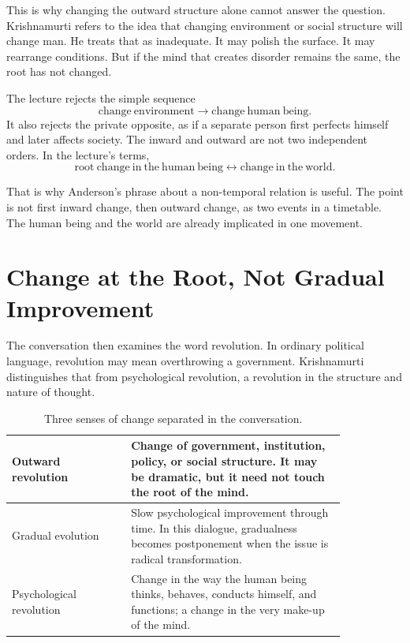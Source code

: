 This is why changing the outward structure alone cannot answer the question. Krishnamurti refers to the idea that changing environment or social structure will change man. He treats that as inadequate. It may polish the surface. It may rearrange conditions. But if the mind that creates disorder remains the same, the root has not changed.

The lecture rejects the simple sequence
\begin{equation}
\mathrm{change\ environment}
\longrightarrow
\mathrm{change\ human\ being}.
\end{equation}
It also rejects the private opposite, as if a separate person first perfects himself and later affects society. The inward and outward are not two independent orders. In the lecture's terms,
\begin{equation}
\mathrm{root\ change\ in\ the\ human\ being}
\longleftrightarrow
\mathrm{change\ in\ the\ world}.
\end{equation}

That is why Anderson's phrase about a non-temporal relation is useful. The point is not first inward change, then outward change, as two events in a timetable. The human being and the world are already implicated in one movement.

\section{Change at the Root, Not Gradual Improvement}

The conversation then examines the word revolution. In ordinary political language, revolution may mean overthrowing a government. Krishnamurti distinguishes that from psychological revolution, a revolution in the structure and nature of thought.

\begin{table}
\centering
\begin{tabular}{|p{0.30\linewidth}|p{0.54\linewidth}|}
\hline
Outward revolution & Change of government, institution, policy, or social structure. It may be dramatic, but it need not touch the root of the mind.\\
\hline
Gradual evolution & Slow psychological improvement through time. In this dialogue, gradualness becomes postponement when the issue is radical transformation.\\
\hline
Psychological revolution & Change in the way the human being thinks, behaves, conducts himself, and functions; a change in the very make-up of the mind.\\
\hline
\end{tabular}
\caption{Three senses of change separated in the conversation.}
\end{table}

